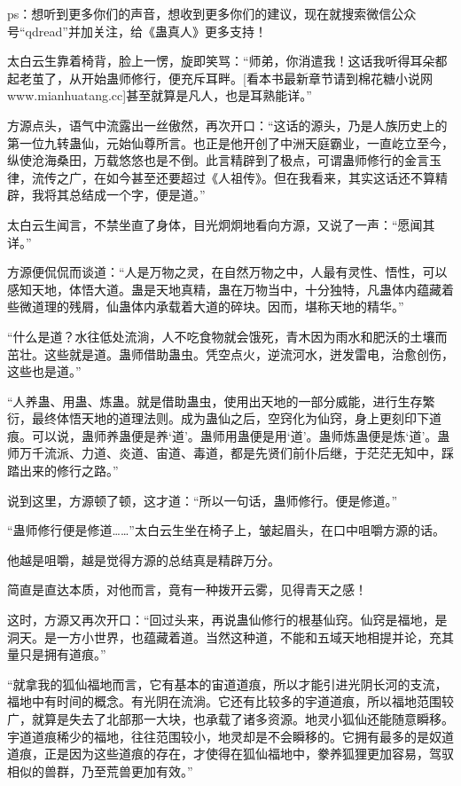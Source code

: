
\begin{this_body}

ps：想听到更多你们的声音，想收到更多你们的建议，现在就搜索微信公众号“qdread”并加关注，给《蛊真人》更多支持！

太白云生靠着椅背，脸上一愣，旋即笑骂：“师弟，你消遣我！这话我听得耳朵都起老茧了，从开始蛊师修行，便充斥耳畔。[看本书最新章节请到棉花糖小说网www.mianhuatang.cc]甚至就算是凡人，也是耳熟能详。”

方源点头，语气中流露出一丝傲然，再次开口：“这话的源头，乃是人族历史上的第一位九转蛊仙，元始仙尊所言。也正是他开创了中洲天庭霸业，一直屹立至今，纵使沧海桑田，万载悠悠也是不倒。此言精辟到了极点，可谓蛊师修行的金言玉律，流传之广，在如今甚至还要超过《人祖传》。但在我看来，其实这话还不算精辟，我将其总结成一个字，便是道。”

太白云生闻言，不禁坐直了身体，目光炯炯地看向方源，又说了一声：“愿闻其详。”

方源便侃侃而谈道：“人是万物之灵，在自然万物之中，人最有灵性、悟性，可以感知天地，体悟大道。蛊是天地真精，蛊在万物当中，十分独特，凡蛊体内蕴藏着些微道理的残屑，仙蛊体内承载着大道的碎块。因而，堪称天地的精华。”

“什么是道？水往低处流淌，人不吃食物就会饿死，青木因为雨水和肥沃的土壤而茁壮。这些就是道。蛊师借助蛊虫。凭空点火，逆流河水，迸发雷电，治愈创伤，这些也是道。”

“人养蛊、用蛊、炼蛊。就是借助蛊虫，使用出天地的一部分威能，进行生存繁衍，最终体悟天地的道理法则。成为蛊仙之后，空窍化为仙窍，身上更刻印下道痕。可以说，蛊师养蛊便是养‘道’。蛊师用蛊便是用‘道’。蛊师炼蛊便是炼‘道’。蛊师万千流派、力道、炎道、宙道、毒道，都是先贤们前仆后继，于茫茫无知中，踩踏出来的修行之路。”

说到这里，方源顿了顿，这才道：“所以一句话，蛊师修行。便是修道。”

“蛊师修行便是修道……”太白云生坐在椅子上，皱起眉头，在口中咀嚼方源的话。

他越是咀嚼，越是觉得方源的总结真是精辟万分。

简直是直达本质，对他而言，竟有一种拨开云雾，见得青天之感！

这时，方源又再次开口：“回过头来，再说蛊仙修行的根基仙窍。仙窍是福地，是洞天。是一方小世界，也蕴藏着道。当然这种道，不能和五域天地相提并论，充其量只是拥有道痕。”

“就拿我的狐仙福地而言，它有基本的宙道道痕，所以才能引进光阴长河的支流，福地中有时间的概念。有光阴在流淌。它还有比较多的宇道道痕，所以福地范围较广，就算是失去了北部那一大块，也承载了诸多资源。地灵小狐仙还能随意瞬移。宇道道痕稀少的福地，往往范围较小，地灵却是不会瞬移的。它拥有最多的是奴道道痕，正是因为这些道痕的存在，才使得在狐仙福地中，豢养狐狸更加容易，驾驭相似的兽群，乃至荒兽更加有效。”


\end{this_body}
